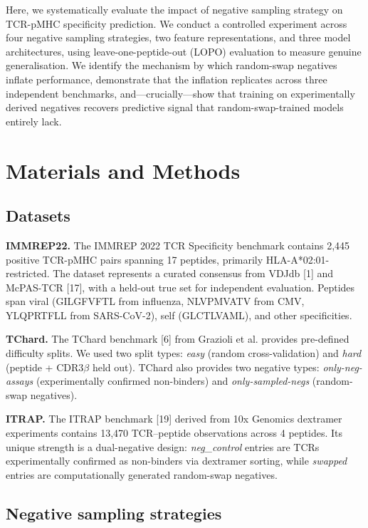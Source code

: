 \documentclass[11pt, a4paper]{article}
\begin{document}
Here, we systematically evaluate the impact of negative sampling strategy on TCR-pMHC specificity prediction. We conduct a controlled experiment across four negative sampling strategies, two feature representations, and three model architectures, using leave-one-peptide-out (LOPO) evaluation to measure genuine generalisation. We identify the mechanism by which random-swap negatives inflate performance, demonstrate that the inflation replicates across three independent benchmarks, and---crucially---show that training on experimentally derived negatives recovers predictive signal that random-swap-trained models entirely lack.

\section{Materials and Methods}

\subsection{Datasets}

\textbf{IMMREP22.} The IMMREP 2022 TCR Specificity benchmark contains 2,445 positive TCR-pMHC pairs spanning 17 peptides, primarily HLA-A*02:01-restricted. The dataset represents a curated consensus from VDJdb [1] and McPAS-TCR [17], with a held-out true set for independent evaluation. Peptides span viral (GILGFVFTL from influenza, NLVPMVATV from CMV, YLQPRTFLL from SARS-CoV-2), self (GLCTLVAML), and other specificities.

\textbf{TChard.} The TChard benchmark [6] from Grazioli et al. provides pre-defined difficulty splits. We used two split types: \textit{easy} (random cross-validation) and \textit{hard} (peptide + CDR3$\beta$ held out). TChard also provides two negative types: \textit{only-neg-assays} (experimentally confirmed non-binders) and \textit{only-sampled-negs} (random-swap negatives).

\textbf{ITRAP.} The ITRAP benchmark [19] derived from 10x Genomics dextramer experiments contains 13,470 TCR--peptide observations across 4 peptides. Its unique strength is a dual-negative design: \textit{neg\_control} entries are TCRs experimentally confirmed as non-binders via dextramer sorting, while \textit{swapped} entries are computationally generated random-swap negatives.

\subsection{Negative sampling strategies}
\end{document}
